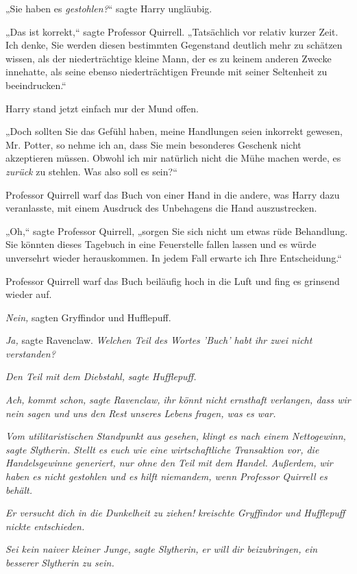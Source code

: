 {„Sie haben es \emph{gestohlen?}“ sagte Harry ungläubig.

„Das ist korrekt,“ sagte Professor Quirrell. „Tatsächlich vor relativ kurzer Zeit. Ich denke, Sie werden diesen bestimmten Gegenstand deutlich mehr zu schätzen wissen, als der niederträchtige kleine Mann, der es zu keinem anderen Zwecke innehatte, als seine ebenso niederträchtigen Freunde mit seiner Seltenheit zu beeindrucken.“

Harry stand jetzt einfach nur der Mund offen.

„Doch sollten Sie das Gefühl haben, meine Handlungen seien inkorrekt gewesen, Mr. Potter, so nehme ich an, dass Sie mein besonderes Geschenk nicht akzeptieren müssen. Obwohl ich mir natürlich nicht die Mühe machen werde, es \emph{zurück} zu stehlen. Was also soll es sein?“

Professor Quirrell warf das Buch von einer Hand in die andere, was Harry dazu veranlasste, mit einem Ausdruck des Unbehagens die Hand auszustrecken.

„Oh,“ sagte Professor Quirrell, „sorgen Sie sich nicht um etwas rüde Behandlung. Sie könnten dieses Tagebuch in eine Feuerstelle fallen lassen und es würde unversehrt wieder herauskommen. In jedem Fall erwarte ich Ihre Entscheidung.“

Professor Quirrell warf das Buch beiläufig hoch in die Luft und fing es grinsend wieder auf.

\emph{Nein,} sagten Gryffindor und Hufflepuff.

\emph{Ja,} sagte Ravenclaw. \emph{Welchen Teil des Wortes 'Buch' habt ihr zwei nicht} \emph{verstanden?}

\emph{Den Teil mit dem Diebstahl,} \emph{sagte Hufflepuff.}

\emph{\emph{Ach, kommt schon,}} \emph{sagte Ravenclaw,} \emph{\emph{ihr könnt nicht ernsthaft verlangen, dass wir nein sagen und uns den Rest unseres Lebens fragen, was es war.}}

\emph{Vom utilitaristischen Standpunkt aus gesehen, klingt es nach einem Nettogewinn,} \emph{sagte Slytherin.} \emph{\emph{Stellt es euch wie eine wirtschaftliche Transaktion vor, die Handelsgewinne generiert, nur ohne den Teil mit dem Handel. Außerdem,}} \emph{wir} \emph{\emph{haben es nicht gestohlen und es hilft niemandem, wenn Professor Quirrell es behält.}}

\emph{Er versucht dich in die Dunkelheit zu ziehen!} \emph{kreischte Gryffindor und Hufflepuff nickte entschieden.}

\emph{\emph{Sei kein naiver kleiner Junge,}} \emph{sagte Slytherin,} \emph{\emph{er}} \emph{\emph{will}} \emph{\emph{dir beizubringen, ein}} \emph{\emph{besserer}} \emph{\emph{Slytherin zu sein.}}

}

